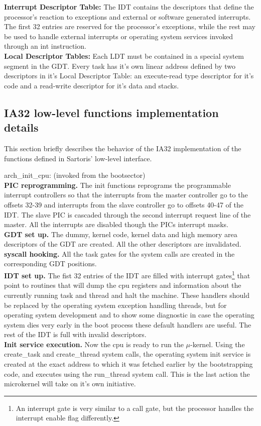\documentclass[12pt, letterpaper, oneside, english]{article}
\begin{document}
\noindent \textbf{Interrupt Descriptor Table:} The IDT contains the descriptors that define the processor's reaction to exceptions and external or software generated interrupts. The first 32 entries are reserved for the processor's exceptions, while the rest may be used to handle external interrupts or operating system services invoked through an \textsf{int} instruction. \\
\textbf{Local Descriptor Tables:} Each LDT must be contained in a special system segment in the GDT. Every task has it's own linear address defined by two descriptors in it's Local Descriptor Table: an execute-read type descriptor for it's code and a read-write descriptor for it's data and stacks. 

\subsection{IA32 low-level functions implementation details}

This section briefly describes the behavior of the IA32 implementation of the functions defined in Sartoris' low-level interface.

\textsf{arch\_init\_cpu}: (invoked from the bootsector) \\ 
\textbf{PIC reprogramming.} The init functions reprograms the programmable interrupt controllers so that the interrupts from the master controller go to the offsets 32-39 and interrupts from the slave controller go to offsets 40-47 of the IDT. The slave PIC is cascaded through the second interrupt request line of the master. All the interrupts are disabled though the PICs interrupt masks. \\
\textbf{GDT set up.} The dummy, kernel code, kernel data and high memory area descriptors of the GDT are created. All the other descriptors are invalidated. \\
\textbf{syscall hooking.} All the task gates for the system calls are created in the corresponding GDT positions. \\
\textbf{IDT set up.} The fist 32 entries of the IDT are filled with interrupt gates\footnote{An interrupt gate is very similar to a call gate, but the processor handles the interrupt enable flag differently.} that point to routines that will dump the cpu registers and information about the currently running task and thread and halt the machine. These handlers should be replaced by the operating system exception handling threads, but for operating system development and to show some diagnostic in case the operating system dies very early in the boot process these default handlers are useful. The rest of the IDT is full with invalid descriptors. \\
\textbf{Init service execution.} Now the cpu is ready to run the $\mu$-kernel. Using the \textsf{create\_task} and \textsf{create\_thread} system calls, the operating system init service is created at the exact address to which it was fetched earlier by the bootstrapping code, and executes using the \textsf{run\_thread} system call. This is the last action the microkernel will take on it's own initiative.
\end{document}
